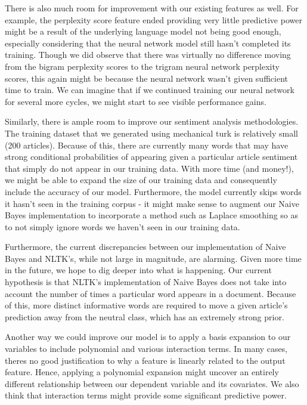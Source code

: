 \documentclass[fleqn,12pt]{SelfArx} %
\begin{document}
There is also much room for improvement with our existing features as well. For example, the perplexity score feature ended providing very little predictive power might be a result of the underlying language model not being good enough, especially considering that the neural network model still hasn't completed its training. Though we did observe that there was virtually no difference moving from the bigram perplexity scores to the trigram neural network perplexity scores, this again might be because the neural network wasn't given sufficient time to train. We can imagine that if we continued training our neural network for several more cycles, we might start to see visible performance gains. 

Similarly, there is ample room to improve our sentiment analysis methodologies. The training dataset that we generated using mechanical turk is relatively small (200 articles). Because of this, there are currently many words that may have strong conditional probabilities of appearing given a particular article sentiment that simply do not appear in our training data. With more time (and money!), we might be able to expand the size of our training data and consequently include the accuracy of our model. Furthermore, the model currently skips words it hasn't seen in the training corpus - it might make sense to augment our Naive Bayes implementation to incorporate a method such as Laplace smoothing so as to not simply ignore words we haven't seen in our training data.

Furthermore, the current discrepancies between our implementation of Naive Bayes and NLTK's, while not large in magnitude, are alarming. Given more time in the future, we hope to dig deeper into what is happening. Our current hypothesis is that NLTK's implementation of Naive Bayes does not take into account the number of times a particular word appears in a document. Because of this, more distinct informative words are required to move a given article's prediction away from the neutral class, which has an extremely strong prior.

Another way we could improve our model is to apply a basis expansion to our variables to include polynomial and various interaction terms. In many cases, theres no good justification to why a feature is linearly related to the output feature. Hence, applying a polynomial expansion might uncover an entirely different relationship between our dependent variable and its covariates. We also think that interaction terms might provide some significant predictive power. 
\end{document}
